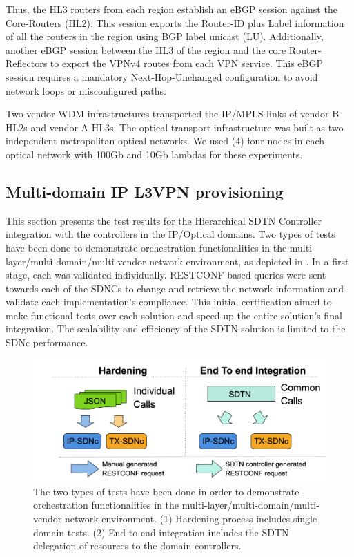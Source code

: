 \documentclass[10pt, conference]{IEEEtran}
\begin{document}
Thus, the HL3 routers from each region establish an eBGP session against the Core-Routers (HL2). This session exports the Router-ID plus Label information of all the routers in the region using BGP label unicast (LU). Additionally, another eBGP session between the HL3 of the region and the core Router-Reflectors to export the VPNv4 routes from each VPN service. This eBGP session requires a mandatory Next-Hop-Unchanged configuration to avoid network loops or misconfigured paths. 

Two-vendor WDM infrastructures transported the IP/MPLS links of vendor B HL2s and vendor A HL3s. The optical transport infrastructure was built as two independent metropolitan optical networks. We used (4) four nodes in each optical network with 100Gb and 10Gb lambdas for these experiments. 

\subsection{Multi-domain IP L3VPN provisioning}

This section presents the test results for the Hierarchical SDTN Controller integration with the controllers in the IP/Optical domains. Two types of tests have been done to demonstrate orchestration functionalities in the multi-layer/multi-domain/multi-vendor network environment, as depicted in . In a first stage, each  was validated individually. RESTCONF-based queries were sent towards each of the SDNCs to change and retrieve the network information and validate each implementation's compliance. This initial certification aimed to make functional tests over each solution and speed-up the entire solution's final integration. The scalability and efficiency of the SDTN  solution is limited to the SDNc performance.

\begin{figure}
	\centering
		\includegraphics[width=\linewidth]{figs/diagram-11.png}
	\caption{The two types of tests have been done in order to demonstrate orchestration functionalities in the multi-layer/multi-domain/multi-vendor network environment. (1) Hardening process includes single domain tests. (2) End to end integration includes the SDTN  delegation of resources to the domain controllers.}
	\label{FIG:testing_workflow}
\end{figure}
\end{document}
